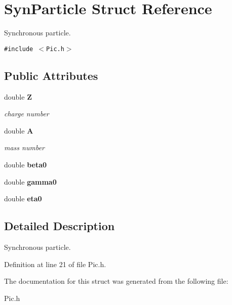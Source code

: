 \section{Syn\-Particle Struct Reference}
\label{structSynParticle}
Synchronous particle. 


{\tt \#include $<$Pic.h$>$}

\subsection*{Public Attributes}
\begin{CompactItemize}
\item 
double {\bf Z}\label{structSynParticle_m0}

\begin{CompactList}\small\item\em charge number\item\end{CompactList}\item 
double {\bf A}\label{structSynParticle_m1}

\begin{CompactList}\small\item\em mass number\item\end{CompactList}\item 
double {\bf beta0}\label{structSynParticle_m2}

\item 
double {\bf gamma0}\label{structSynParticle_m3}

\item 
double {\bf eta0}\label{structSynParticle_m4}

\end{CompactItemize}


\subsection{Detailed Description}
Synchronous particle.



Definition at line 21 of file Pic.h.

The documentation for this struct was generated from the following file:\begin{CompactItemize}
\item 
Pic.h\end{CompactItemize}
